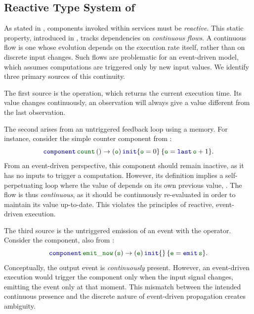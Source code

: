 \subsection{Reactive Type System of \GRFRP}
\label{sec:semantics:grfrp:react_typing}

As stated in , components invoked within services must be
\emph{reactive}. This static property, introduced in ,
tracks dependencies on \emph{continuous flows}. A continuous flow is one whose evolution depends
on the execution rate itself, rather than on discrete input changes. Such flows are
problematic for an event-driven model, which assumes computations are triggered only by new
input values. We identify three primary sources of this continuity.

The first source is the \timeop operation, which returns the current execution time. Its value
changes continuously, an observation will always give a value different from the last observation.

The second arises from an untriggered feedback loop using a  memory. For instance,
consider the simple counter component from :
\begin{equation*}
    \component{\idf{count}}{}{\idf{o}}{\idf{o} = \last{\idf{o}} + 1}{\idf{o} = 0}.
\end{equation*}
From an event-driven perspective, this component should remain inactive, as it has no inputs
to trigger a computation. However, its definition implies a self-perpetuating loop where the
value of  depends on its own previous value, . The flow is thus
\emph{continuous}, as it should be continuously re-evaluated in order to maintain its value
up-to-date. This violates the principles of reactive, event-driven execution.

The third source is the untriggered emission of an event with the  operator.
Consider the  component, also from :
\begin{equation*}
    \component{\idf{emit\_now}}{\idf{s}}{\idf{e}}{\idf{e} = \emit{\idf{s}}}{}.
\end{equation*}
Conceptually, the output event  is \emph{continuously} present. However, an
event-driven execution would trigger the component only when the input signal 
changes, emitting the event only at that moment. This mismatch between the intended
continuous presence and the discrete nature of event-driven propagation creates ambiguity.

